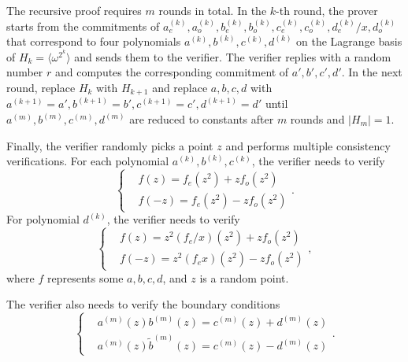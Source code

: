The recursive proof requires $m$ rounds in total. In the $k$-th round, the prover starts from the commitments of $a^{(k)}_e,a^{(k)}_o,b^{(k)}_e,b^{(k)}_o,c^{(k)}_e,c^{(k)}_o,d^{(k)}_e/x,d^{(k)}_o$ that correspond to four polynomials $a^{(k)},b^{(k)},c^{(k)},d^{(k)}$ on the Lagrange basis of $H_k=\langle\omega^{2^k}\rangle$ and sends them to the verifier. The verifier replies with a random number $r$ and computes the corresponding commitment of $a',b',c',d'$.
In the next round, replace $H_k$ with $H_{k+1}$ and replace $a,b,c,d$ with $a^{(k+1)}=a',b^{(k+1)}=b',c^{(k+1)}=c',d^{(k+1)}=d'$ until $a^{(m)},b^{(m)},c^{(m)},d^{(m)}$ are reduced to constants after $m$ rounds and $|H_m|=1$.

Finally, the verifier randomly picks a point $z$ and performs multiple consistency verifications. For each polynomial $a^{(k)},b^{(k)},c^{(k)}$, the verifier needs to verify
\[
    \left\{ \begin{aligned}
        & f(z) = f_e(z^2) + zf_o(z^2) \\
        & f(-z) = f_e(z^2) - zf_o(z^2)
    \end{aligned} \right. .
\]
For polynomial $d^{(k)}$, the verifier needs to verify
\[
    \left\{ \begin{aligned}
        & f(z) = z^2(f_e/x)(z^2) + zf_o(z^2) \\
        & f(-z) = z^2(f_ex)(z^2) - zf_o(z^2)
    \end{aligned} \right. ,
\]
where $f$ represents some $a,b,c,d$, and $z$ is a random point.

The verifier also needs to verify the boundary conditions
\[
    \left\{ \begin{aligned}
        & a^{(m)}(z)b^{(m)}(z) = c^{(m)}(z) + d^{(m)}(z) \\
        & a^{(m)}(z)\tilde{b}^{(m)}(z) = c^{(m)}(z) - d^{(m)}(z)
    \end{aligned} \right. .
\]
